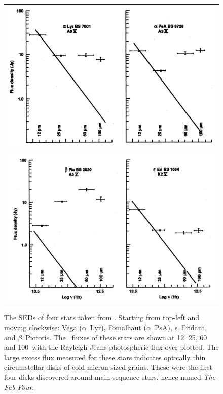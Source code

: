     \begin{figure}
    \centering
    \begin{tabular}{c}
    \includegraphics[width=.7\textwidth]{Ch1/backman_parsece_1993_IRExcesses_1}  \\
     \includegraphics[width=.7\textwidth]{Ch1/backman_parsece_1993_IRExcesses_2}
    \end{tabular}
    \caption[SEDs of Fab Four Disks]{The SEDs of four stars taken from \citet{Backman1993}. Starting from top-left and moving clockwise: Vega ($\alpha$~Lyr), Fomalhaut ($\alpha$~PsA), $\epsilon$~Eridani, and $\beta$~Pictoris. The \iras\ fluxes of these stars are shown at 12, 25, 60 and 100\micron\ with the Rayleigh-Jeans photospheric flux over-plotted. The large excess flux measured for these stars indicates optically thin circumstellar disks of cold micron sized grains. These were the first four disks discovered around main-sequence stars, hence named \textit{The Fab Four}.}
    \label{fig:fab_four}
    \end{figure}
    
